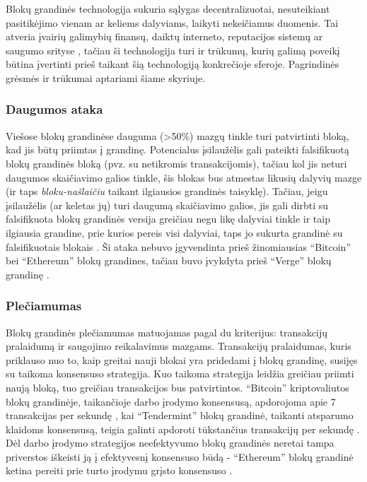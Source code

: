 Blokų grandinės technologija sukuria sąlygas decentralizuotai, nesuteikiant pasitikėjimo vienam ar keliems dalyviams, laikyti nekeičiamus duomenis.
Tai atveria įvairių galimybių finansų, daiktų interneto, reputacijos sistemų ar saugumo srityse \cite{Zheng2017}, tačiau ši technologija turi ir trūkumų,
kurių galimą poveikį būtina įvertinti prieš taikant šią technologiją konkrečioje sferoje. Pagrindinės grėsmės ir trūkumai aptariami šiame skyriuje.

\subsubsection{Daugumos ataka}

Viešose blokų grandinėse dauguma (>50\%) mazgų tinkle turi patvirtinti bloką, kad jis būtų priimtas į grandinę. Potencialus įsilaužėlis gali pateikti
falsifikuotą blokų grandinės bloką (pvz. su netikromis transakcijomis), tačiau kol jis neturi daugumos skaičiavimo galios tinkle, šis blokas bus
atmestas likusių dalyvių mazge (ir taps \textit{bloku-našlaičiu} taikant ilgiausios grandinės taisyklę). Tačiau, jeigu įsilaužėlis (ar keletas jų)
turi daugumą skaičiavimo galios, jis gali dirbti su falsifikuota blokų grandinės versija greičiau negu likę dalyviai tinkle ir taip ilgiausia grandine, prie kurios
pereis visi dalyviai, taps jo sukurta grandinė su falsifikuotais blokais \cite{Zheng2017}. Ši ataka nebuvo įgyvendinta prieš žinomiausias \enquote{Bitcoin} bei \enquote{Ethereum} blokų grandines, tačiau
buvo įvykdyta prieš \enquote{Verge} blokų grandinę \cite{Sedgwick2018}.

\subsubsection{Plečiamumas}

Blokų grandinės plečiamumas matuojamas pagal du kriterijus: transakcijų pralaidumą ir saugojimo reikalavimus mazgams. Transakcijų pralaidumas, kuris priklauso nuo to,
kaip greitai nauji blokai yra pridedami į blokų grandinę, susijęs su taikoma konsensuso strategija.
Kuo taikoma strategija leidžia greičiau priimti naują bloką, tuo greičiau transakcijos bus patvirtintos. \enquote{Bitcoin} kriptovaliutos blokų grandinėje, taikančioje darbo įrodymo konsensusą,
apdorojoma apie 7 transakcijas per sekundę \cite{Zheng2017}, kai \enquote{Tendermint} blokų grandinė, taikanti
atsparumo klaidoms konsensusą, teigia galinti apdoroti tūkstančius transakcijų per sekundę \cite{Tendermint2017}. Dėl darbo įrodymo strategijos neefektyvumo
blokų grandinės neretai tampa priverstos iškeisti ją į efektyvesnį konsensuso būdą - \enquote{Ethereum} blokų grandinė ketina pereiti prie turto įrodymu grįsto konsensuso \cite{Ethereum}.


